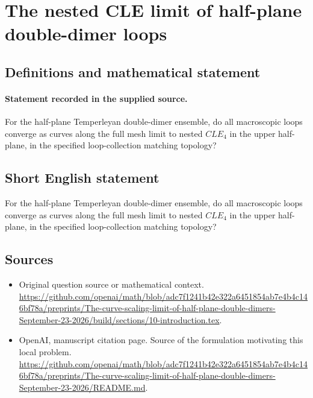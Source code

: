 \documentclass[11pt]{article}
\begin{document}
\section*{The nested CLE limit of half-plane double-dimer loops}\label{30007349}
\subsection{Definitions and mathematical statement}
\paragraph{Statement recorded in the supplied source.}
For the half-plane Temperleyan double-dimer ensemble, do all macroscopic loops converge as curves along the full mesh limit to nested $CLE_4$ in the upper half-plane, in the specified loop-collection matching topology?
\subsection{Short English statement}
For the half-plane Temperleyan double-dimer ensemble, do all macroscopic loops converge as curves along the full mesh limit to nested $CLE_4$ in the upper half-plane, in the specified loop-collection matching topology?
\subsection{Sources}
\begin{itemize}
\item[S1] Original question source or mathematical context.
\url{https://github.com/openai/math/blob/adc7f1241b42e322a6451854ab7e4b4c146bf78a/preprints/The-curve-scaling-limit-of-half-plane-double-dimers-September-23-2026/build/sections/10-introduction.tex}.
\item[S2] OpenAI, manuscript citation page. Source of the formulation motivating this local problem.
\url{https://github.com/openai/math/blob/adc7f1241b42e322a6451854ab7e4b4c146bf78a/preprints/The-curve-scaling-limit-of-half-plane-double-dimers-September-23-2026/README.md}.
\end{itemize}
\end{document}
